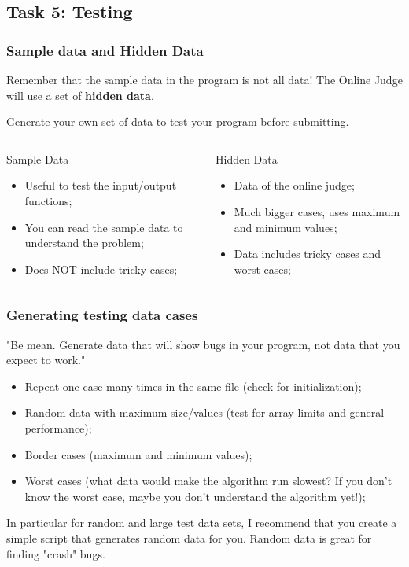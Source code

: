 \subsection{Task 5: Testing}
\begin{frame}
  \frametitle{Sample data and Hidden Data}
  Remember that the sample data in the program is not all data! The Online Judge will use a set of {\bf hidden data}.
  \bigskip

  Generate your own set of data to test your program before submitting.
  \bigskip

  \begin{columns}
    \begin{exampleblock}{Sample Data}
      \begin{itemize}
      \item Useful to test the input/output functions;
      \item You can read the sample data to understand the problem;
      \item Does NOT include tricky cases;
      \end{itemize}
    \end{exampleblock}
    \begin{alertblock}{Hidden Data}
      \begin{itemize}
      \item Data of the online judge;
      \item Much bigger cases, uses maximum and minimum values;
      \item Data includes tricky cases and worst cases;
      \end{itemize}
    \end{alertblock}
  \end{columns}
\end{frame}

\begin{frame}
  \frametitle{Generating testing data cases}
  "Be mean. Generate data that will show bugs in your program, not data
  that you expect to work."

  \begin{itemize}
  \item Repeat one case many times in the same file (check for initialization);
  \item Random data with maximum size/values (test for array limits and general performance);
  \item Border cases (maximum and minimum values);
  \item Worst cases (what data would make the algorithm run slowest? If you don't know the worst case, maybe you don't understand the algorithm yet!);
  \end{itemize}
  \bigskip

  In particular for random and large test data sets, I recommend that you create a simple script that generates random data for you. Random data is great for finding "crash" bugs.
\end{frame}

